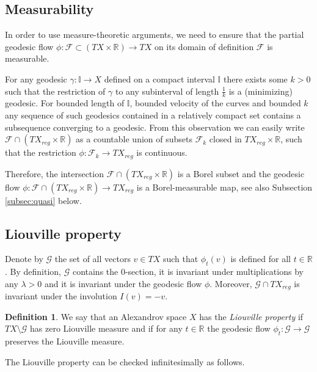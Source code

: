 \documentclass[12pt,leqno]{amsart}
\numberwithin{equation}{section}
\theoremstyle{definition}
\newtheorem{defn}[thm]{Definition}%
\theoremstyle{remark}
\newcommand{\R}{\mathbb{R}}
\def\:{\colon}
\begin{document}
\subsection{Measurability} \label{subsec:measur}
In order to use measure-theoretic arguments, we need to ensure that the partial geodesic flow $\phi:\mathcal F\subset (TX\times \R) \to TX$ on its domain of definition $\mathcal F$
is measurable.

For any  geodesic $\gamma :\mathbb I\to X$ defined on a compact interval $\mathbb I$ there exists some $k>0$ such that  the restriction of $\gamma$ to any subinterval of length $\frac 1 k$ is
a (minimizing) geodesic. For bounded length of $\mathbb I$, bounded velocity of the curves and bounded $k$ any sequence of such  geodesics contained in a relatively compact set
contains a subsequence converging to a  geodesic. From this observation we can easily write  $\mathcal F\cap (TX_{reg} \times \R)$ as a countable union of subsets $\mathcal F_k$ closed in
$TX_{reg} \times \R$, such that the restriction $\phi: \mathcal F_k \to TX_{reg}$ is continuous.

Therefore,  the intersection $\mathcal F\cap (TX_{reg} \times \R )$ is a Borel subset  and the geodesic flow
$\phi :\mathcal F\cap (TX_{reg} \times \R)  \to TX_{reg}$ is a Borel-measurable map, see also Subsection \ref{subsec:quasi} below.








\subsection{Liouville property}
 Denote by $\mathcal G$ the set of all vectors $v\in TX $ such that $\phi _t(v)$ is defined for all $t\in \R$. By definition, $\mathcal G$ contains the $0$-section, it
 is invariant under multiplications by any $\lambda >0$  and it is invariant under the geodesic flow $\phi$. Moreover, $\mathcal G\cap TX_{reg}$ is invariant under the involution $I (v)=-v$.
  \begin{defn}
 We say that an Alexandrov space $X$ has the \emph{Liouville property} if  $TX\setminus \mathcal G$ has zero Liouville measure  and if
for any $t\in \R$ the geodesic flow $\phi _t \:\mathcal G\to \mathcal G$ preserves the Liouville measure.
 \end{defn}

The Liouville property can be checked infinitesimally as follows.
\end{document}
